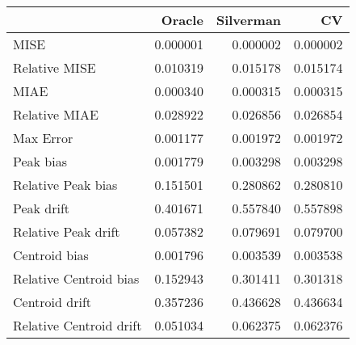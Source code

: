 \begin{tabular}{lrrr}
  \hline
 & Oracle & Silverman & CV \\ 
  \hline
MISE & 0.000001 & 0.000002 & 0.000002 \\ 
  Relative MISE & 0.010319 & 0.015178 & 0.015174 \\ 
  MIAE & 0.000340 & 0.000315 & 0.000315 \\ 
  Relative MIAE & 0.028922 & 0.026856 & 0.026854 \\ 
  Max Error & 0.001177 & 0.001972 & 0.001972 \\ 
  Peak bias & 0.001779 & 0.003298 & 0.003298 \\ 
  Relative Peak bias & 0.151501 & 0.280862 & 0.280810 \\ 
  Peak drift & 0.401671 & 0.557840 & 0.557898 \\ 
  Relative Peak drift & 0.057382 & 0.079691 & 0.079700 \\ 
  Centroid bias & 0.001796 & 0.003539 & 0.003538 \\ 
  Relative Centroid bias & 0.152943 & 0.301411 & 0.301318 \\ 
  Centroid drift & 0.357236 & 0.436628 & 0.436634 \\ 
  Relative Centroid drift & 0.051034 & 0.062375 & 0.062376 \\ 
   \hline
\end{tabular}
